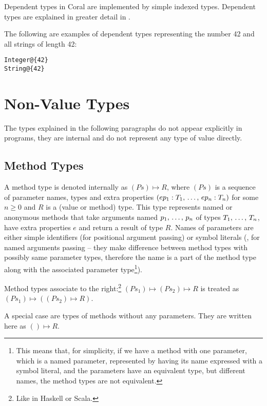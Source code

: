 Dependent types in Coral are implemented by simple indexed types. Dependent types are explained in greater detail in . 

\example The following are examples of dependent types representing the number 42 and all strings of length 42:
\begin{lstlisting}
Integer@{42}
String@{42}
\end{lstlisting}

\section{Non-Value Types}

The types explained in the following paragraphs do not appear explicitly in programs, they are internal and do not represent any type of value directly. 

\subsection{Method Types}
\label{sec:method-types}

A method type is denoted internally as $(Ps) \mapsto R$, where $(Ps)$ is a sequence of parameter names, types and extra properties $(ep_1 : T_1 ,\, \ldots ,\, ep_n : T_n)$ for some $n \geq 0$ and $R$ is a (value or method) type. This type represents named or anonymous methods that take arguments named $p_1 ,\, \ldots ,\, p_n$ of types $T_1 ,\, \ldots ,\, T_n$, have extra properties $e$ and return a result of type $R$. Names of parameters are either simple identifiers (for positional argument passing) or symbol literals (, for named arguments passing -- they make difference between method types with possibly same parameter types, therefore the name is a part of the method type along with the associated parameter type\footnote{This means that, for simplicity, if we have a method with one parameter, which is a named parameter, represented by having its name expressed with a symbol literal, and the parameters have an equivalent type, but different names, the method types are not equivalent.}). 

Method types associate to the right:\footnote{Like in Haskell or Scala.} \newline
$(Ps_1) \mapsto (Ps_2) \mapsto R$ is treated as $(Ps_1) \mapsto ((Ps_2) \mapsto R)$. 

A special case are types of methods without any parameters. They are written here as $() \mapsto R$. 

